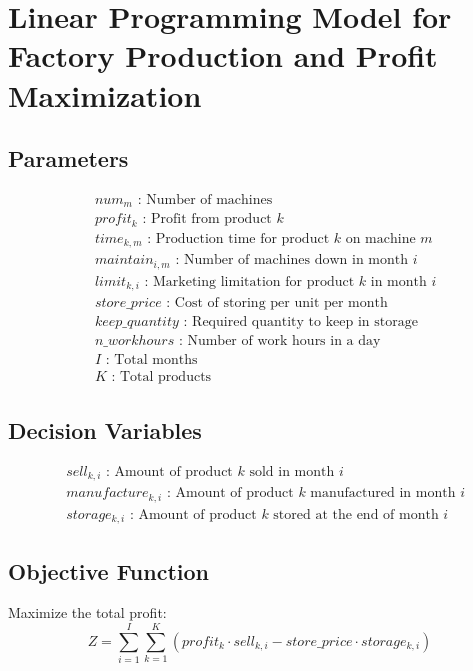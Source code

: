 \documentclass{article}
\begin{document}
\section*{Linear Programming Model for Factory Production and Profit Maximization}

\subsection*{Parameters}

\begin{align*}
& num_m \text{ : Number of machines} \\
& profit_k \text{ : Profit from product } k \\
& time_{k,m} \text{ : Production time for product } k \text{ on machine } m \\
& maintain_{i,m} \text{ : Number of machines down in month } i \\
& limit_{k,i} \text{ : Marketing limitation for product } k \text{ in month } i \\
& store\_price \text{ : Cost of storing per unit per month} \\
& keep\_quantity \text{ : Required quantity to keep in storage} \\
& n\_workhours \text{ : Number of work hours in a day} \\
& I \text{ : Total months} \\
& K \text{ : Total products}
\end{align*}

\subsection*{Decision Variables}

\begin{align*}
& sell_{k,i} \text{ : Amount of product } k \text{ sold in month } i \\
& manufacture_{k,i} \text{ : Amount of product } k \text{ manufactured in month } i \\
& storage_{k,i} \text{ : Amount of product } k \text{ stored at the end of month } i
\end{align*}

\subsection*{Objective Function}

Maximize the total profit:
\[
Z = \sum_{i=1}^{I} \sum_{k=1}^{K} (profit_k \cdot sell_{k,i} - store\_price \cdot storage_{k,i})
\]
\end{document}
